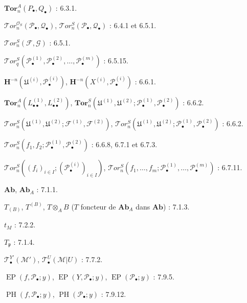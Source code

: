 \begin{flushleft}
$\mathbf{Tor}_n^A(P_\bullet,Q_\bullet)$ : 6.3.1.

\medskip
$\mathscr{T}\!or_n^{\mathscr O_S}(\mathscr P_\bullet,\mathscr Q_\bullet)$,
$\mathscr{T}\!or_n^S(\mathscr P_\bullet,\mathscr Q_\bullet)$ : 6.4.1 et 6.5.1.

\medskip
$\mathscr{T}\!or_n^S(\mathscr F,\mathscr G)$ : 6.5.1.

\medskip
$\mathscr{T}\!or_q^S(\mathscr P_\bullet^{(1)},\mathscr P_\bullet^{(2)},\ldots,
\mathscr P_\bullet^{(m)})$ : 6.5.15.

\medskip
$\mathbf H^{-n}(\mathfrak U^{(i)},\mathscr P_\bullet^{(i)})$,
$\mathbf H^{-n}(X^{(i)},\mathscr P_\bullet^{(i)})$ : 6.6.1.

\medskip
$\mathbf{Tor}_n^A(L_{\bullet\bullet}^{(1)},L_{\bullet\bullet}^{(2)})$,
$\mathbf{Tor}_n^S(\mathfrak U^{(1)},\mathfrak U^{(2)};
\mathscr P_\bullet^{(1)},\mathscr P_\bullet^{(2)})$ : 6.6.2.

\medskip
$\mathscr{T}\!or_n^S(\mathfrak U^{(1)},\mathfrak U^{(2)};
\mathscr F^{(1)},\mathscr F^{(2)})$,
$\mathscr{T}\!or_n^S(\mathfrak U^{(1)},\mathfrak U^{(2)};
\mathscr P_\bullet^{(1)},\mathscr P_\bullet^{(2)})$ : 6.6.2.

\medskip
$\mathscr{T}\!or_n^S(f_1,f_2;\mathscr P_\bullet^{(1)},
\mathscr P_\bullet^{(2)})$ : 6.6.8, 6.7.1 et 6.7.3.

\medskip
$\mathscr{T}\!or_n^S((f_i)_{i\in I};(\mathscr P_\bullet^{(i)})_{i\in I})$,
$\mathscr{T}\!or_n^S(f_1,\ldots,f_m;\mathscr P_\bullet^{(1)},\ldots,
\mathscr P_\bullet^{(m)})$ : 6.7.11.

\medskip
$\mathbf{Ab}$, $\mathbf{Ab}_A$ : 7.1.1.

\medskip
$T_{(B)}$, $T^{(B)}$, $T\otimes_A B$
($T$ foncteur de $\mathbf{Ab}_A$ dans $\mathbf{Ab}$) : 7.1.3.

\medskip
$t_M$ : 7.2.2.

\medskip
$T_{\mathfrak p}$ : 7.1.4.

\medskip
$\mathscr T_\bullet^{Y'}(\mathscr M')$,
$\mathscr T_\bullet^U(\mathscr M|U)$ : 7.7.2.

\medskip
$\operatorname{EP}(f,\mathscr P_\bullet;y)$,
$\operatorname{EP}(Y,\mathscr P_\bullet;y)$,
$\operatorname{EP}(\mathscr P_\bullet;y)$ : 7.9.5.

\medskip
$\operatorname{PH}(f,\mathscr P_\bullet;y)$,
$\operatorname{PH}(\mathscr P_\bullet;y)$ : 7.9.12.
\end{flushleft}

\clearpage
{}
